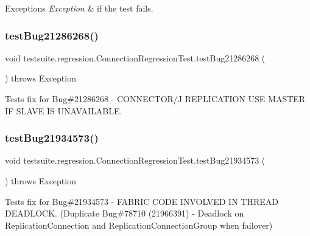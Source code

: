 \begin{DoxyExceptions}{Exceptions}
{\em Exception} & if the test fails. \\
\hline
\end{DoxyExceptions}
\mbox{\label{classtestsuite_1_1regression_1_1_connection_regression_test_ab5a03581f2da17e71bf3d9449439c888}} 
\subsubsection{\texorpdfstring{test\+Bug21286268()}{testBug21286268()}}
{\footnotesize\ttfamily void testsuite.\+regression.\+Connection\+Regression\+Test.\+test\+Bug21286268 (\begin{DoxyParamCaption}{ }\end{DoxyParamCaption}) throws Exception}

Tests fix for Bug\#21286268 -\/ C\+O\+N\+N\+E\+C\+T\+O\+R/J R\+E\+P\+L\+I\+C\+A\+T\+I\+ON U\+SE M\+A\+S\+T\+ER IF S\+L\+A\+VE IS U\+N\+A\+V\+A\+I\+L\+A\+B\+LE. \mbox{\label{classtestsuite_1_1regression_1_1_connection_regression_test_a1cbe215e0e75477350d50bfaa49af95e}} 
\subsubsection{\texorpdfstring{test\+Bug21934573()}{testBug21934573()}}
{\footnotesize\ttfamily void testsuite.\+regression.\+Connection\+Regression\+Test.\+test\+Bug21934573 (\begin{DoxyParamCaption}{ }\end{DoxyParamCaption}) throws Exception}

Tests fix for Bug\#21934573 -\/ F\+A\+B\+R\+IC C\+O\+DE I\+N\+V\+O\+L\+V\+ED IN T\+H\+R\+E\+AD D\+E\+A\+D\+L\+O\+CK. (Duplicate Bug\#78710 (21966391) -\/ Deadlock on Replication\+Connection and Replication\+Connection\+Group when failover)

